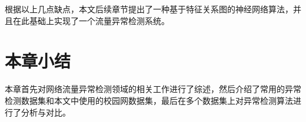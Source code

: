 根据以上几点缺点，本文后续章节提出了一种基于特征关系图的神经网络算法，并且在此基础上实现了一个流量异常检测系统。

\section{本章小结}
本章首先对网络流量异常检测领域的相关工作进行了综述，然后介绍了常用的异常检测数据集和本文中使用的校园网数据集，最后在多个数据集上对异常检测算法进行了分析与对比。


  
  
  
  
  
  





